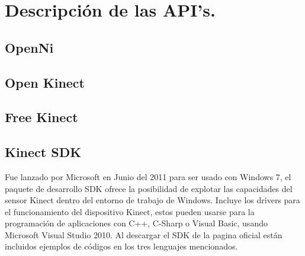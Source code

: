 \documentclass[11pt,a4paper]{article}
\begin{document}
\section{Descripción de las API's.}
\subsection{OpenNi}
\subsection{Open Kinect}
\subsection{Free Kinect}

\subsection{Kinect SDK}
Fue lanzado por Microsoft en Junio del 2011 para ser usado con Windows 7, el paquete de desarrollo SDK ofrece la posibilidad de explotar las capacidades del sensor Kinect dentro del entorno de trabajo de Windows. Incluye los drivers para el funcionamiento del dispositivo Kinect, estos pueden usarse para la programación de aplicaciones con C++, C-Sharp o Visual Basic, usando Microsoft Visual Studio 2010. Al descargar el SDK de la pagina oficial están incluidos ejemplos de códigos en los tres lenguajes mencionados.
\end{document}
